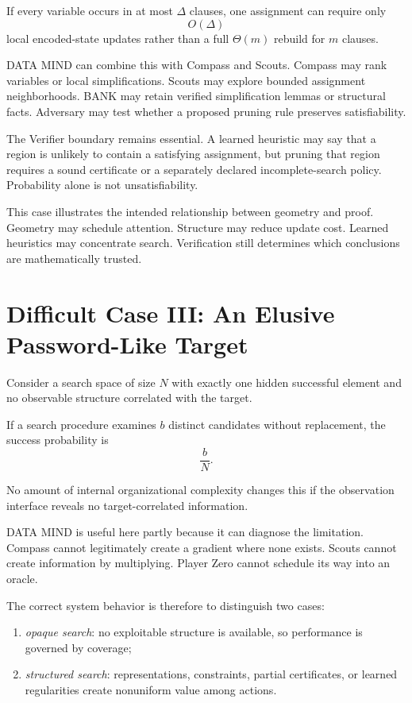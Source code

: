 \documentclass[11pt]{article}
\begin{document}
If every variable occurs in at most $\Delta$ clauses, one assignment can require only
\[
O(\Delta)
\]
local encoded-state updates rather than a full $\Theta(m)$ rebuild for $m$ clauses.

DATA MIND can combine this with Compass and Scouts. Compass may rank variables or local simplifications. Scouts may explore bounded assignment neighborhoods. BANK may retain verified simplification lemmas or structural facts. Adversary may test whether a proposed pruning rule preserves satisfiability.

The Verifier boundary remains essential. A learned heuristic may say that a region is unlikely to contain a satisfying assignment, but pruning that region requires a sound certificate or a separately declared incomplete-search policy. Probability alone is not unsatisfiability.

This case illustrates the intended relationship between geometry and proof. Geometry may schedule attention. Structure may reduce update cost. Learned heuristics may concentrate search. Verification still determines which conclusions are mathematically trusted.

\section{Difficult Case III: An Elusive Password-Like Target}

Consider a search space of size $N$ with exactly one hidden successful element and no observable structure correlated with the target.

If a search procedure examines $b$ distinct candidates without replacement, the success probability is
\[
\frac{b}{N}.
\]

No amount of internal organizational complexity changes this if the observation interface reveals no target-correlated information.

DATA MIND is useful here partly because it can diagnose the limitation. Compass cannot legitimately create a gradient where none exists. Scouts cannot create information by multiplying. Player Zero cannot schedule its way into an oracle.

The correct system behavior is therefore to distinguish two cases:
\begin{enumerate}
\item \emph{opaque search}: no exploitable structure is available, so performance is governed by coverage;
\item \emph{structured search}: representations, constraints, partial certificates, or learned regularities create nonuniform value among actions.
\end{enumerate}
\end{document}
